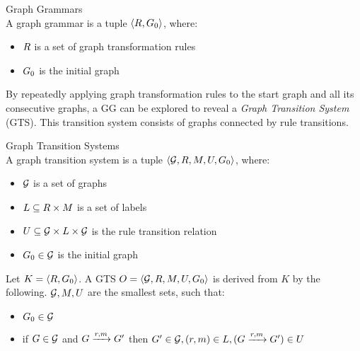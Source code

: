 \vspace{10px}
\begin{definition} Graph Grammars \\
A graph grammar is a tuple $\langle R, G_0 \rangle$, where:
\begin{itemize}
\item $R$ is a set of graph transformation rules
\item $G_0$ is the initial graph
\end{itemize}
\end{definition}
\vspace{10px}

By repeatedly applying graph transformation rules to the start graph and all its consecutive graphs, a GG can be explored to reveal a \textit{Graph Transition System} (GTS). This transition system consists of graphs connected by rule transitions.

\vspace{10px}
\begin{definition} Graph Transition Systems \\
A graph transition system is a tuple	$\langle \mathcal{G}, R, M, U, G_0\rangle$, where:
\begin{itemize}
\item $\mathcal{G}$ is a set of graphs
\item $L \subseteq R \times M$ is a set of labels
\item $U \subseteq \mathcal{G} \times L \times \mathcal{G}$ is the rule transition relation
\item $G_0 \in \mathcal{G}$ is the initial graph
\end{itemize}
\end{definition}
\vspace{10px}

Let $K = \langle R, G_0 \rangle$. A GTS $O = \langle \mathcal{G}, R, M, U, G_0\rangle$ is derived from $K$ by the following. $\mathcal{G}, M, U$ are the smallest sets, such that:
\begin{itemize}
\item $G_0 \in \mathcal{G}$
\item if $G \in \mathcal{G}$ and $G \xrightarrow{r, m}G'$ then $G' \in \mathcal{G}, (r, m) \in L, (G \xrightarrow{r, m}G') \in U$
\end{itemize}


